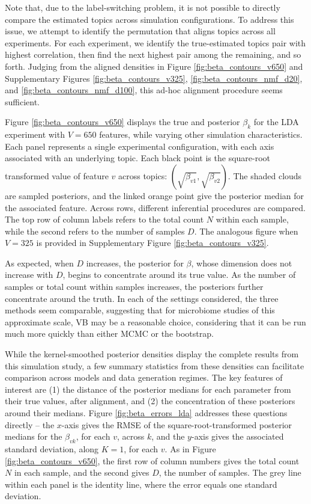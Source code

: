 \documentclass[oupdraft]{bio}
\begin{document}
Note that, due to the label-switching problem, it is not possible to directly
compare the estimated topics across simulation configurations. To address this
issue, we attempt to identify the permutation that aligns topics across all
experiments. For each experiment, we identify the true-estimated topics pair
with highest correlation, then find the next highest pair among the remaining,
and so forth. Judging from the aligned densities in Figure
\ref{fig:beta_contours_v650} and Supplementary Figures
\ref{fig:beta_contours_v325}, \ref{fig:beta_contours_nmf_d20}, and
\ref{fig:beta_contours_nmf_d100}, this ad-hoc alignment procedure seems
sufficient.

Figure \ref{fig:beta_contours_v650} displays the true and posterior $\beta_{k}$
for the LDA experiment with $V = 650$ features, while varying other simulation
characteristics. Each panel represents a single experimental configuration, with
each axis associated with an underlying topic. Each black point is the
square-root transformed value of feature $v$ across topics:
$\left(\sqrt{\beta_{v1}}, \sqrt{\beta_{v2}}\right)$. The shaded clouds are
sampled posteriors, and the linked orange point give the posterior median for the
associated feature. Across rows, different inferential procedures are compared.
The top row of column labels refers to the total count $N$ within each sample,
while the second refers to the number of samples $D$. The analogous figure when
$V = 325$ is provided in Supplementary Figure \ref{fig:beta_contours_v325}.

As expected, when $D$ increases, the posterior for $\beta$, whose dimension does
not increase with $D$, begins to concentrate around its true value. As the
number of samples or total count within samples increases, the posteriors
further concentrate around the truth. In each of the settings considered, the
three methods seem comparable, suggesting that for microbiome studies of this
approximate scale, VB may be a reasonable choice, considering that it can be run
much more quickly than either MCMC or the bootstrap.

While the kernel-smoothed posterior densities display the complete results from
this simulation study, a few summary statistics from these densities can
facilitate comparison across models and data generation regimes. The key
features of interest are (1) the distance of the posterior medians for each
parameter from their true values, after alignment, and (2) the concentration of
these posteriors around their medians. Figure \ref{fig:beta_errors_lda}
addresses these questions directly -- the $x$-axis gives the RMSE of the
square-root-transformed posterior medians for the $\beta_{vk}$, for each $v$,
across $k$, and the $y$-axis gives the associated standard deviation, along $K =
1$, for each $v$. As in Figure \ref{fig:beta_contours_v650}, the first row of
column numbers gives the total count $N$ in each sample, and the second gives
$D$, the number of samples. The grey line within each panel is the identity
line, where the error equals one standard deviation.
\end{document}
